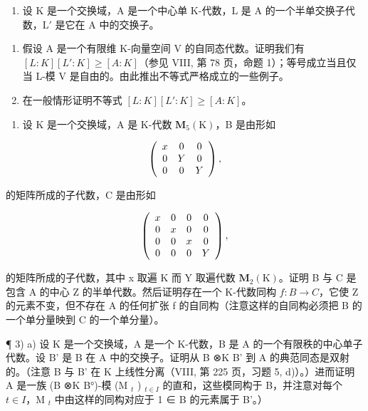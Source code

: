 
\begin{enumerate}
\def\labelenumi{\arabic{enumi})}
\tightlist
\item
  设 \(\mathrm{K}\) 是一个交换域，\(\mathrm{A}\) 是一个中心单 K-代数，\(\mathrm{L}\) 是 \(\mathrm{A}\) 的一个半单交换子代数，\(\mathrm{L}'\) 是它在 \(\mathrm{A}\) 中的交换子。
\end{enumerate}

\begin{enumerate}
\def\labelenumi{\alph{enumi})}
\item
  假设 A 是一个有限维 K-向量空间 V 的自同态代数。证明我们有 \([L:K][L':K] \geqslant [A:K]\)（参见 VIII, 第 78 页，命题 1）；等号成立当且仅当 L-模 V 是自由的。由此推出不等式严格成立的一些例子。
\item
  在一般情形证明不等式 \([L:K][L':K] \geqslant [A:K]\)。
\end{enumerate}

\begin{enumerate}
\def\labelenumi{\arabic{enumi})}
\setcounter{enumi}{1}
\tightlist
\item
  设 K 是一个交换域，A 是 K-代数 \(\mathbf{M}_{5}(\mathrm{K})\)，B 是由形如
\end{enumerate}

\[
\left( \begin{array}{c c c} x & 0 & 0 \\ 0 & Y & 0 \\ 0 & 0 & Y \end{array} \right)  ,
\]

的矩阵所成的子代数，C 是由形如

\[
\left( \begin{array}{c c c c} x & 0 & 0 & 0 \\ 0 & x & 0 & 0 \\ 0 & 0 & x & 0 \\ 0 & 0 & 0 & Y \end{array} \right)  ,
\]

的矩阵所成的子代数，其中 x 取遍 K 而 Y 取遍代数 \(\mathbf{M}_{2}(\mathrm{K})\)。证明 B 与 C 是包含 A 的中心 Z 的半单代数。然后证明存在一个 K-代数同构 \(f: B \to C\)，它使 Z 的元素不变，但不存在 A 的任何扩张 f 的自同构（注意这样的自同构必须把 B 的一个单分量映到 C 的一个单分量）。

¶ 3) a) 设 K 是一个交换域，A 是一个 K-代数，B 是 A 的一个有限秩的中心单子代数。设 B' 是 B 在 A 中的交换子。证明从 B ⊗K B' 到 A 的典范同态是双射的。（注意 B 与 B' 在 K 上线性分离（VIII, 第 225 页，习题 5, d)）。）进而证明 A 是一族 (B ⊗K B°)-模 (M \(_{t}\) ) \(_{t\in I}\) 的直和，这些模同构于 B，并注意对每个 \(t\in I\)，M \(_{t}\) 中由这样的同构对应于 1 ∈ B 的元素属于 B'。）

